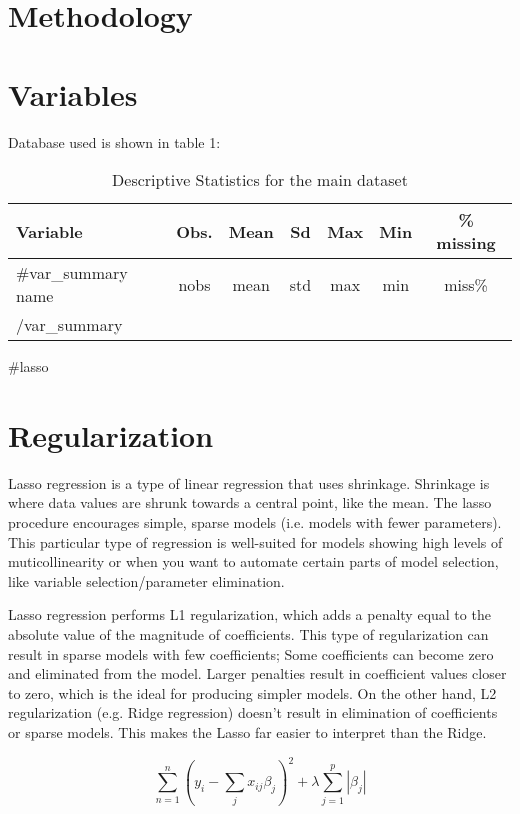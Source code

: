 \documentclass{article}
\begin{document}
\section{Methodology}


\section{Variables}

Database used is shown in table 1:

\begin{table}[!h]
  \centering
  \caption{Descriptive Statistics for the main dataset}
    \begin{tabular}{|p{5cm}|c|c|c|c|c|c|}
    \hline
    Variable & Obs. & Mean & Sd & Max & Min & \% missing \\
    \hline
    \hline
    {{#var_summary}}
    {{name}} & {{nobs}} & {{mean}} & {{std}} & {{max}} & {{min}} & {{miss}}\% \\ 
    \hline
    {{/var_summary}}
    \end{tabular}
\end{table}


{{#lasso}}
\section{Regularization}

Lasso regression is a type of linear regression that uses shrinkage. Shrinkage is where data values are shrunk towards a central point, like the mean. The lasso procedure encourages simple, sparse models (i.e. models with fewer parameters). This particular type of regression is well-suited for models showing high levels of muticollinearity or when you want to automate certain parts of model selection, like variable selection/parameter elimination.

Lasso regression performs L1 regularization, which adds a penalty equal to the absolute value of the magnitude of coefficients. This type of regularization can result in sparse models with few coefficients; Some coefficients can become zero and eliminated from the model. Larger penalties result in coefficient values closer to zero, which is the ideal for producing simpler models. On the other hand, L2 regularization (e.g. Ridge regression) doesn’t result in elimination of coefficients or sparse models. This makes the Lasso far easier to interpret than the Ridge.

\begin{equation}
    \sum_{n=1}^{n}(y_i - \sum_{j}x_{ij}\beta_{j})^2 + \lambda \sum_{j=1}^p|\beta_{j}|
\end{equation}
\end{document}
